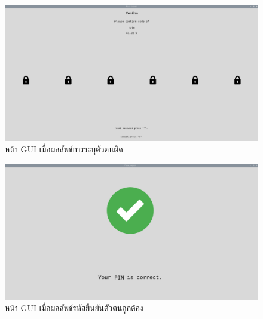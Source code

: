 \begin{figure}[!ht]
    \begin{center}
      \includegraphics[scale=.35]{pic/comfirm_page.png}
      \caption[หน้า GUI เมื่อผลลัพธ์การระบุตัวตนผิด]{หน้า GUI เมื่อผลลัพธ์การระบุตัวตนผิด}
      \label{fig:com_page}
    \end{center}
\end{figure}


\begin{figure}[!ht]
  \begin{center}
    \includegraphics[scale=.35]{pic/pin_correct.png}
    \caption[หน้า GUI เมื่อผลลัพธ์รหัสยืนยันตัวตนถูกต้อง]{หน้า GUI เมื่อผลลัพธ์รหัสยืนยันตัวตนถูกต้อง}
    \label{fig:pin_correct}
  \end{center}
\end{figure}


